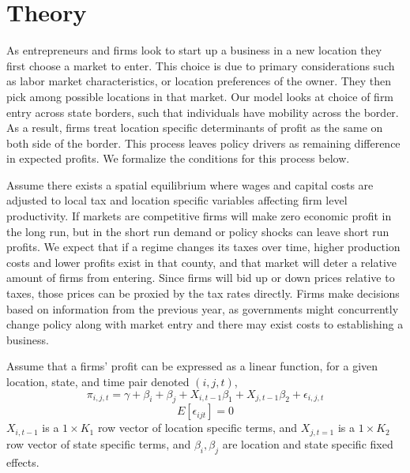 \section{Theory}

As entrepreneurs and firms look to start up a business in a new location they first choose a market to enter. This choice is due to primary considerations such as labor market characteristics, or location preferences of the owner. They then pick among possible locations in that market. Our model looks at choice of firm entry across state borders, such that individuals have mobility across the border. As a result, firms treat location specific determinants of profit as the same on both side of the border. This process leaves policy drivers as remaining difference in expected profits. We formalize the conditions for this process below.

Assume there exists a spatial equilibrium where wages and capital costs are adjusted to local tax and location specific variables affecting firm level productivity. If markets are competitive firms will make zero economic profit in the long run, but in the short run demand or policy shocks can leave short run profits. We expect that if a regime changes its taxes over time, higher production costs and lower profits exist in that county, and that market will deter a relative amount of firms from entering. Since firms will bid up or down prices relative to taxes, those prices can be proxied by the tax rates directly. Firms make decisions based on information from the previous year, as governments might concurrently change policy along with market entry and there may exist costs to establishing a business.

\begin{assumption}
Assume that a firms' profit can be expressed as a linear function, for a given location, state, and time pair denoted $(i,j,t)$,
\begin{equation}
\pi_{i,j,t} =  \gamma+\beta_{i}+\beta_{j}+X_{i,t-1}\beta_{1}+X_{j,t-1}\beta_{2}+\epsilon_{i,j,t}
\end{equation}
\begin{equation}
E[\epsilon_{ijt}] = 0
\end{equation}
$X_{i,t-1}$ is a $1 \times K_{1}$ row vector of location specific terms, and $X_{j,t=1}$ is a $1 \times K_{2}$ row vector of state specific terms, and $\beta_{i}, \beta_{j}$ are location and state specific fixed effects.
\end{assumption}

